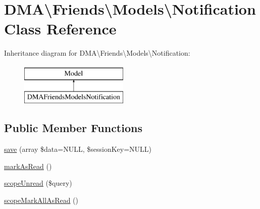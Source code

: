\hypertarget{classDMA_1_1Friends_1_1Models_1_1Notification}{\section{D\+M\+A\textbackslash{}Friends\textbackslash{}Models\textbackslash{}Notification Class Reference}
\label{classDMA_1_1Friends_1_1Models_1_1Notification}
}
Inheritance diagram for D\+M\+A\textbackslash{}Friends\textbackslash{}Models\textbackslash{}Notification\+:\begin{figure}[H]
\begin{center}
\leavevmode
\includegraphics[height=2.000000cm]{de/d7f/classDMA_1_1Friends_1_1Models_1_1Notification}
\end{center}
\end{figure}
\subsection*{Public Member Functions}
\begin{DoxyCompactItemize}
\item 
\hyperlink{classDMA_1_1Friends_1_1Models_1_1Notification_a221608de6df08ac2cab3b145410bc012}{save} (array \$data=N\+U\+L\+L, \$session\+Key=N\+U\+L\+L)
\item 
\hyperlink{classDMA_1_1Friends_1_1Models_1_1Notification_a8618793fa0a9030d6cbfae08a3b74803}{mark\+As\+Read} ()
\item 
\hyperlink{classDMA_1_1Friends_1_1Models_1_1Notification_a92a7c07cfcd4bcb202edb6969fc8c309}{scope\+Unread} (\$query)
\item 
\hyperlink{classDMA_1_1Friends_1_1Models_1_1Notification_ab1e72f01e20cbe1027318a202938dc07}{scope\+Mark\+All\+As\+Read} ()
\end{DoxyCompactItemize}
